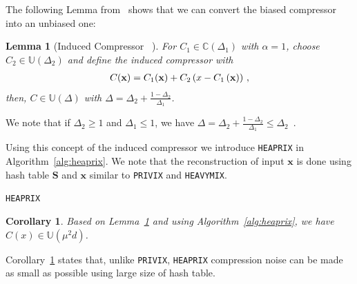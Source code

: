 \documentclass[twoside]{article}
\newtheorem{lemma}{Lemma}
\newtheorem{remark}{Remark}
\newtheorem{corollary}{Corollary}
\begin{document}
The following Lemma from~\cite{horvath2020better} shows that we can convert the biased compressor into an unbiased one: 
\begin{lemma}[Induced Compressor ~\cite{horvath2020better}]\label{lemm:induced_compress}
For $C_1\in \mathbb{C}(\Delta_1)$ with $\alpha=1$, choose $C_2\in \mathbb{U}(\Delta_2)$ and define the induced compressor with
\begin{align}\notag
    C(\mathbf{x})=C_1(\mathbf{x})+C_2\left(x-C_1\left(\mathbf{x}\right)\right)\, ,
\end{align}
then, $C\in\mathbb{U}(\Delta)$ with $\Delta=\Delta_2+\frac{1-\Delta_2}{\Delta_1}$.
\end{lemma}
We note that if $\Delta_2\geq 1$ and $\Delta_1\leq 1$, we have $\Delta=\Delta_2+\frac{1-\Delta_2}{\Delta_1}\leq \Delta_2$\, .

Using this concept of the induced compressor we introduce \texttt{HEAPRIX} in Algorithm~\ref{alg:heaprix}.  
We note that the reconstruction of input $\mathbf{x}$ is done using hash table $\mathbf{S}$ and $\mathbf{x}$ similar to \texttt{PRIVIX} and \texttt{HEAVYMIX}.
\begin{algorithm}[t]
\caption{\texttt{HEAPRIX} }\label{alg:heaprix}
\begin{algorithmic}[1]
\end{algorithmic}
\end{algorithm}

\begin{corollary}\label{cor:small}
Based on Lemma~\ref{lemm:induced_compress} and using Algorithm~\ref{alg:heaprix}, we have $C(x)\in \mathbb{U}(\mu^2 d)$. 
\end{corollary}
Corollary~\ref{cor:small} states that, unlike \texttt{PRIVIX}, \texttt{HEAPRIX} compression noise can be made as small as possible using large size of hash table.
\end{document}

